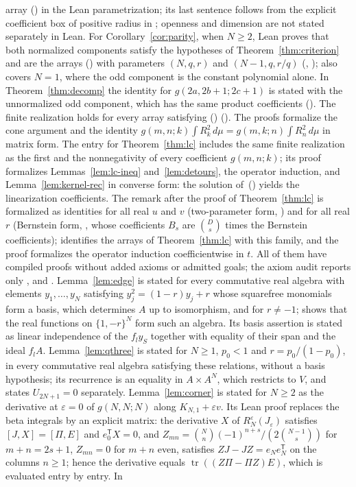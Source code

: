 \documentclass[twoside,10pt]{article}
\numberwithin{equation}{section}
\theoremstyle{slbody}
\theoremstyle{definition}
\theoremstyle{remark}
\renewcommand{\eqref}[1]{\textup{{\normalfont(\oldstylenums{\ref{#1}}}\normalfont)}}
\begin{document}
array \eqref{eq:parameters} in the Lean parametrization; its last sentence follows from the explicit coefficient box of positive radius in ; openness and dimension are not stated separately in Lean. For Corollary~\ref{cor:parity}, when $N\geq2$, Lean proves that both normalized components satisfy the hypotheses of Theorem~\ref{thm:criterion} and are the arrays \eqref{eq:parameters} with parameters $(N,q,r)$ and $(N-1,q,r/q)$ (, );  also covers $N=1$, where the odd component is the constant polynomial alone. In Theorem~\ref{thm:decomp} the identity for $g(2a,2b+1;2c+1)$ is stated with the unnormalized odd component, which has the same product coefficients (). The finite realization holds for every array satisfying \eqref{eq:basic} (). The proofs formalize the cone argument and the identity $g(m,n;k)\int R_k^2\,d\mu=g(m,k;n)\int R_n^2\,d\mu$ in matrix form. The entry for Theorem~\ref{thm:lc} includes the same finite realization as the first and the nonnegativity of every coefficient $g(m,n;k)$; its proof formalizes Lemmas~\ref{lem:lc-ineq} and~\ref{lem:detours}, the operator induction, and Lemma~\ref{lem:kernel-rec} in converse form: the solution of~\eqref{eq:kernel-rec} yields the linearization coefficients. The remark after the proof of Theorem~\ref{thm:lc} is formalized as identities for all real $u$ and $v$ (two-parameter form, ) and for all real $r$ (Bernstein form, , whose coefficients $B_s$ are $\binom Ds$ times the Bernstein coefficients);  identifies the arrays of Theorem~\ref{thm:lc} with this family, and the proof formalizes the operator induction coefficientwise in $t$. All of them have compiled proofs without added axioms or admitted goals; the axiom audit reports only ,  and . Lemma~\ref{lem:edge} is stated for every commutative real algebra with elements $y_1,\ldots,y_N$ satisfying $y_j^2=(1-r)y_j+r$ whose squarefree monomials form a basis, which determines $A$ up to isomorphism, and for $r\neq-1$;  shows that the real functions on $\{1,-r\}^N$ form such an algebra. Its basis assertion is stated as linear independence of the $f_ly_S$ together with equality of their span and the ideal $f_lA$. Lemma~\ref{lem:qthree} is stated for $N\geq1$, $p_0<1$ and $r=p_0/(1-p_0)$, in every commutative real algebra satisfying these relations, without a basis hypothesis; its recurrence is an equality in $A\times A^N$, which restricts to $V$, and  states $U_{2N+1}=0$ separately. Lemma~\ref{lem:corner} is stated for $N\geq2$ as the derivative at $\varepsilon=0$ of $g(N,N;N)$ along $K_{N,1}+\varepsilon v$. Its Lean proof replaces the beta integrals by an explicit matrix: the derivative $X$ of $R_N^\varepsilon(J_\varepsilon)$ satisfies $[J,X]=[\Pi,E]$ and $e_0^\mathsf TX=0$, and $Z_{mn}=\binom Nn(-1)^{n+s}/(2\binom{N-1}s)$ for $m+n=2s+1$, $Z_{mn}=0$ for $m+n$ even, satisfies $ZJ-JZ=e_Ne_N^\mathsf T$ on the columns $n\geq1$; hence the derivative equals $\operatorname{tr}((Z\Pi-\Pi Z)E)$, which is evaluated entry by entry. In 
\end{document}
